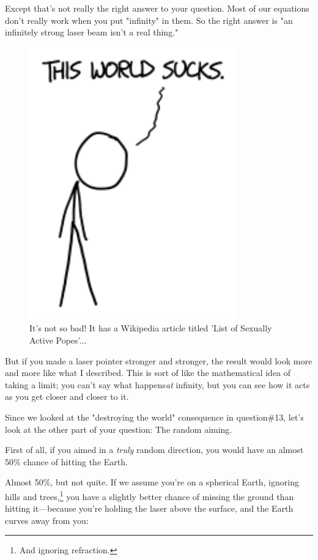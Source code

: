 {{Except that's not really the right answer to your question. Most of our equations don't really work when you put "infinity" in them. So the right answer is "an infinitely strong laser beam isn't a real thing."}

\begin{figure}[!htbp]
\centering
\includegraphics[scale=0.5, max width=0.8\textwidth]{imgs/a/109/sucks.png}
\caption{It's not so bad! It has a Wikipedia article titled 'List of Sexually Active Popes'...}
\end{figure}

{But if you made a laser pointer stronger and stronger, the result would look more and more like what I described. This is sort of like the mathematical idea of taking a limit; you can't say what happens\emph{at} infinity, but you can see how it acts as you get closer and closer to it.}

{Since we looked at the "destroying the world" consequence in question\#13, let's look at the other part of your question: The random aiming.}

{First of all, if you aimed in a \emph{truly} random direction, you would have an almost 50\% chance of hitting the Earth.}

{Almost 50\%, but not quite. If we assume you're on a spherical Earth, ignoring hills and trees,{\footnote{And ignoring refraction.} } you have a slightly better chance of missing the ground than hitting it—because you're holding the laser above the surface, and the Earth curves away from you:}

}
